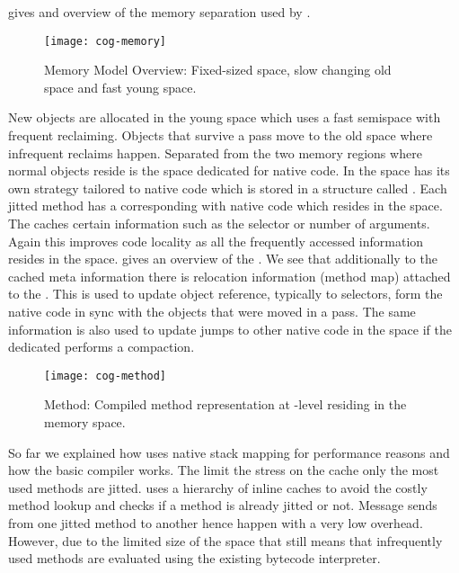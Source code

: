  gives and overview of the memory separation used by \Cog.
%
\begin{figure}[h]
	\centering
	\texttt{[image: cog-memory]}
	\caption[\Cog Memory Model Overview]{\Cog Memory Model Overview: Fixed-sized \JIT space, slow changing old space and fast young space.}
\end{figure}
%
New objects are allocated in the young space which uses a fast semispace \GC with frequent reclaiming.
Objects that survive a \GC pass move to the old space where infrequent reclaims happen.
Separated from the two memory regions where normal \PH objects reside is the \JIT space dedicated for native code.
In \Cog the \JIT space has its own \GC strategy tailored to native code which is stored in a structure called .
Each jitted \PH method has a corresponding  with native code which resides in the \JIT space.
The  caches certain information such as the selector or number of arguments.
Again this improves code locality as all the frequently accessed information resides in the \JIT space.
 gives an overview of the .
We see that additionally to the cached meta information there is relocation information (method map) attached to the .
This is used to update object reference, typically to selectors, form the native code in sync with the objects that were moved in a \GC pass.
The same information is also used to update jumps to other native code in the \JIT space if the dedicated \JIT \GC performs a compaction.
%
\begin{figure}[h]
	\centering
	\texttt{[image: cog-method]}
	\caption[\Cog Method]{\Cog Method: Compiled method representation at \JIT-level residing in the \JIT memory space.}
\end{figure}

So far we explained how \Cog uses native stack mapping for performance reasons and how the basic \JIT compiler works.
The limit the stress on the \CPU cache only the most used methods are jitted.
\Cog uses a hierarchy of inline caches to avoid the costly method lookup and checks if a method is already jitted or not.
Message sends from one jitted method to another hence happen with a very low overhead.
However, due to the limited size of the \JIT space that still means that infrequently used methods are evaluated using the existing bytecode interpreter.




